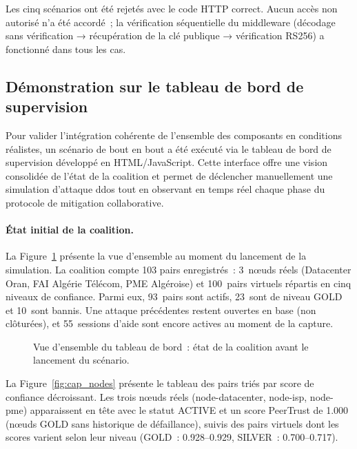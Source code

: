 Les cinq scénarios ont été rejetés avec le code HTTP correct. Aucun accès non autorisé n'a été accordé~; la vérification séquentielle du middleware (décodage sans vérification → récupération de la clé publique → vérification RS256) a fonctionné dans tous les cas.

\subsection{Démonstration sur le tableau de bord de supervision}
\label{subsec:demo_dashboard}

Pour valider l'intégration cohérente de l'ensemble des composants en conditions réalistes, un scénario de bout en bout a été exécuté via le tableau de bord de supervision développé en HTML/JavaScript. Cette interface offre une vision consolidée de l'état de la coalition et permet de déclencher manuellement une simulation d'attaque \gls{ddos} tout en observant en temps réel chaque phase du protocole de mitigation collaborative.

\paragraph{État initial de la coalition.}
La Figure~\ref{fig:cap_overview} présente la vue d'ensemble au moment du lancement de la simulation. La coalition compte 103 pairs enregistrés~: 3~nœuds réels (Datacenter Oran, FAI Algérie Télécom, PME Algéroise) et 100~pairs virtuels répartis en cinq niveaux de confiance. Parmi eux, 93~pairs sont actifs, 23~sont de niveau GOLD et 10~sont bannis. Une attaque précédentes restent ouvertes en base (non clôturées), et 55~sessions d'aide sont encore actives au moment de la capture.

\begin{figure}[H]
\centering
{}
\caption{Vue d'ensemble du tableau de bord~: état de la coalition avant le lancement du scénario.}
\label{fig:cap_overview}
\end{figure}

La Figure~\ref{fig:cap_nodes} présente le tableau des pairs triés par score de confiance décroissant. Les trois nœuds réels (node-datacenter, node-isp, node-pme) apparaissent en tête avec le statut ACTIVE et un score PeerTrust de 1.000 (nœuds GOLD sans historique de défaillance), suivis des pairs virtuels dont les scores varient selon leur niveau (GOLD~: 0.928–0.929, SILVER~: 0.700–0.717).

